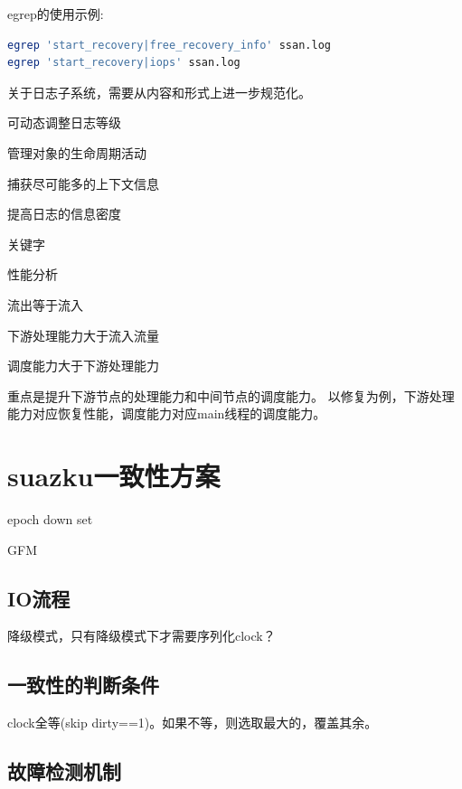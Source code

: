 egrep的使用示例:
\begin{lstlisting}[language=bash,frame=single]
egrep 'start_recovery|free_recovery_info' ssan.log
egrep 'start_recovery|iops' ssan.log
\end{lstlisting}

关于日志子系统，需要从内容和形式上进一步规范化。
\begin{enumbox}
\item 可动态调整日志等级
\item 管理对象的生命周期活动
\item 捕获尽可能多的上下文信息
\item 提高日志的信息密度
\item 关键字
\end{enumbox}

性能分析
\begin{enumbox}
\item 流出等于流入
\item 下游处理能力大于流入流量
\item 调度能力大于下游处理能力
\end{enumbox}

重点是提升下游节点的处理能力和中间节点的调度能力。
以修复为例，下游处理能力对应恢复性能，调度能力对应main线程的调度能力。

\section{suazku一致性方案}

epoch down set

GFM

\subsection{IO流程}



降级模式，只有降级模式下才需要序列化clock？

\subsection{一致性的判断条件}

clock全等(skip dirty==1)。如果不等，则选取最大的，覆盖其余。

\subsection{故障检测机制}


